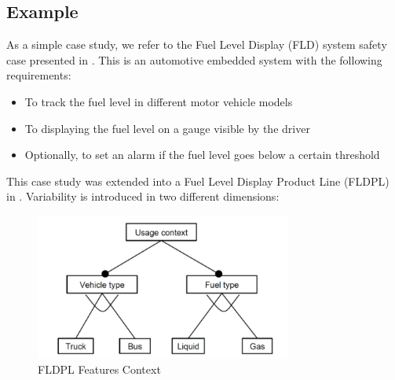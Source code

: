 \documentclass[11pt]{article}
\begin{document}
%
%
%
%
%

\subsection{Example}

As a simple case study, we refer to the Fuel Level Display (FLD) system safety case presented in \cite{Dardar_2014}. This is an automotive embedded system with the following requirements:

\begin{itemize}
 \item To track the fuel level in different motor vehicle models
 \item To displaying the fuel level on a gauge visible by the driver
 \item Optionally, to set an alarm if the fuel level goes below a certain threshold 
 \end{itemize}
 
 This case study was extended into a Fuel Level Display Product Line (FLDPL) in \cite{Gallucci_2013}. Variability is introduced in two different dimensions:
 
 \begin{figure}
  \centering
  \includegraphics[width=0.75\textwidth]{FLDPLContext}
  \caption{FLDPL Features Context}
  \label{fig:FLDPLContext}
\end{figure}
\end{document}
